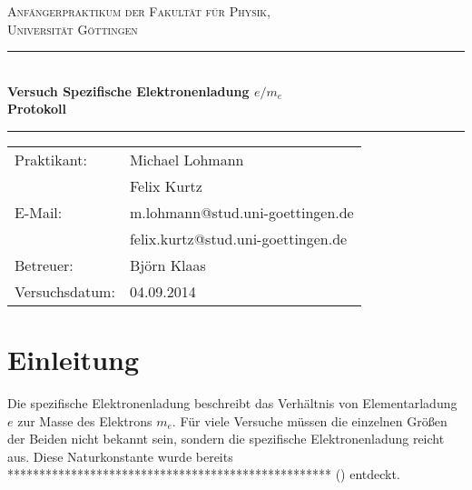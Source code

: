 \documentclass[12pt,a4paper,titlepage,headinclude,bibtotoc]{scrartcl}
\begin{document}
\newpage
\begin{titlepage}
\centering
\textsc{\Large Anfängerpraktikum der Fakultät für
  Physik,\\[1.5ex] Universität Göttingen}

\vspace*{3cm}

\rule{\textwidth}{1pt}\\[0.5cm]
{\huge \bfseries
  Versuch Spezifische Elektronenladung $e/m_e$\\[1.5ex]
  Protokoll}\\[0.5cm]
\rule{\textwidth}{1pt}

\vspace*{3cm}

\begin{Large}
\begin{tabular}{ll}
Praktikant: &  Michael Lohmann\\
 &  Felix Kurtz\\
 E-Mail: & m.lohmann@stud.uni-goettingen.de\\
 &  felix.kurtz@stud.uni-goettingen.de\\
 Betreuer: & Björn Klaas\\
 Versuchsdatum: & 04.09.2014\\
\end{tabular}
\end{Large}

\vspace*{0.8cm}

\begin{Large}
\end{Large}

\end{titlepage}

\tableofcontents

\newpage

\section{Einleitung}
\label{sec:einleitung}
Die spezifische Elektronenladung beschreibt das Verhältnis von Elementarladung $e$ zur Masse des Elektrons $m_e$.
Für viele Versuche müssen die einzelnen Größen der Beiden nicht bekannt sein, sondern die spezifische Elektronenladung reicht aus.
Diese Naturkonstante wurde bereits *************************************************** (\cite[S. ]{gerthsen}) entdeckt.
\end{document}
